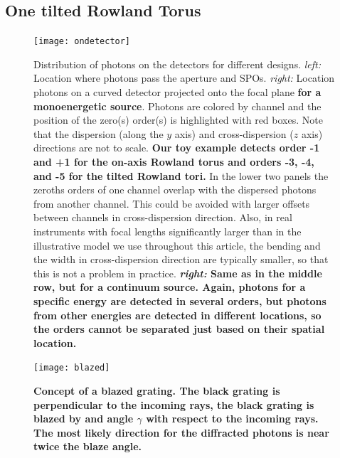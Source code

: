 \documentclass[linenumbers]{aastex631}
\begin{document}
\subsection{One tilted Rowland Torus}


\begin{figure}
    \centering
    \texttt{[image: ondetector]}
    \caption{Distribution of photons on the detectors for different designs. \emph{left:} Location where photons pass the aperture and SPOs. \emph{right:} Location photons on a curved detector projected onto the focal plane \textbf{for a monoenergetic source}. Photons are colored by channel and the position of the zero(s) order(s) is highlighted with red boxes. Note that the dispersion (along the $y$ axis) and cross-dispersion ($z$ axis) directions are not to scale. \textbf{Our toy example detects order -1 and +1 for the on-axis Rowland torus and orders -3, -4, and -5 for the tilted Rowland tori.} In the lower two panels the zeroths orders of one channel overlap with the dispersed photons from another channel. This could be avoided with larger offsets between channels in cross-dispersion direction. Also, in real instruments with focal lengths significantly larger than in the illustrative model we use throughout this article, the bending and the width in cross-dispersion direction are typically smaller, so that this is not a problem in practice.
    \textbf{\emph{right:} Same as in the middle row, but for a continuum source. Again, photons for a specific energy are detected in several orders, but photons from other energies are detected in different locations, so the orders cannot be separated just based on their spatial location.}
        }
    \label{fig:fish}
\end{figure}

\begin{figure}
    \centering
    \texttt{[image: blazed]}
    \caption{\textbf{Concept of a blazed grating. The black grating is perpendicular to the incoming rays, the black grating is blazed by and angle $\gamma$ with respect to the incoming rays. The most likely direction for the diffracted photons is near twice the blaze angle.}}
    \label{fig:blazed}
\end{figure}
\end{document}
